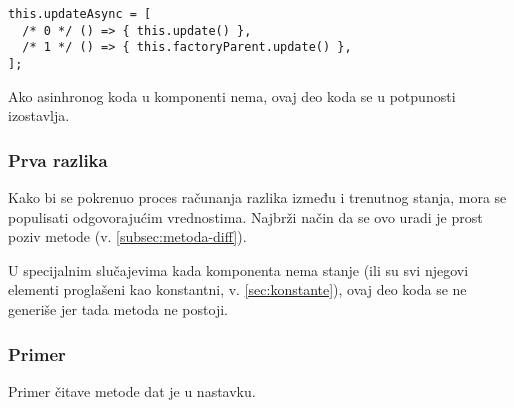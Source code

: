 \begin{lstlisting}
this.updateAsync = [
  /* 0 */ () => { this.update() },
  /* 1 */ () => { this.factoryParent.update() },
];
\end{lstlisting}

Ako asinhronog koda u komponenti nema, ovaj deo koda se u potpunosti izostavlja.

\subsubsection{Prva razlika}
\label{subsubsec:init-part-10}

Kako bi se pokrenuo proces računanja razlika između  i trenutnog stanja, mora se populisati  odgovorajućim vrednostima.
Najbrži način da se ovo uradi je prost poziv metode  (v. \cref{subsec:metoda-diff}).

U specijalnim slučajevima kada komponenta nema stanje (ili su svi njegovi elementi proglašeni kao konstantni, v. \cref{sec:konstante}), ovaj deo koda se ne generiše jer tada metoda  ne postoji.

\subsubsection{Primer}

Primer čitave metode  dat je u nastavku.

